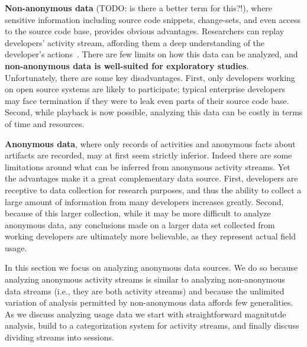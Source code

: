\noindent
{\bf Non-anonymous data} (TODO: is there a better term for this?!), where sensitive information including source code snippets, change-sets, and even access to the source code base, provides obvious advantages. Researchers can replay developers' activity stream, affording them a deep understanding of the developer's actions~\cite{UseDisuseMisuseRefactoringsExtendedVersion}. There are few limits on how this data can be analyzed, and {\bf non-anonymous data is well-suited for exploratory studies}. Unfortunately, there are some key disadvantages. First, only developers working on open source systems are likely to participate; typical enterprise developers may face termination if they were to leak even parts of their source code base. Second, while playback is now possible, analyzing this data can be costly in terms of time and resources. 

\vspace{0.1in}

\noindent
{\bf Anonymous data}, where only records of activities and anonymous facts about artifacts are recorded, may at first seem strictly inferior. Indeed there are some limitations around what can be inferred from anonymous activity streams. Yet the advantages make it a great complementary data source. First, developers are receptive to data collection for research purposes, and thus the ability to collect a large amount of information from many developers increases greatly. Second, because of this larger collection, while it may be more difficult to analyze anonymous data, any conclusions made on a larger data set collected from working developers are ultimately more believable, as they represent actual field usage. 

In this section we focus on analyzing anonymous data sources. We do so because analyzing anonymous activity streams is similar to analyzing non-anonymous data streams (i.e., they are both activity streams) and because the unlimited variation of analysis permitted by non-anonymous data affords few generalities. As we discuss analyzing usage data we start with straightforward magnitutde analysis, build to a categorization system for activity streams, and finally discuss dividing streams into sessions. 
